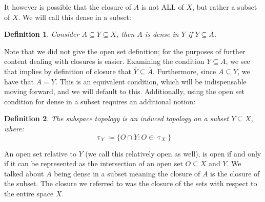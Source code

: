 \documentclass[10pt,letterpaper]{article} %
\newtheorem{defn}{Definition}[section]
\begin{document}
It however is possible that the closure of $A$ is not ALL of $X$, but rather a subset of $X$. We will call this dense in a subset:
\begin{defn}
Consider $A \subseteq Y \subseteq X$, then $A$ is dense in $Y$ if $Y \subseteq \bar{A}$.
\end{defn}
Note that we did not give the open set definition; for the purposes of further content dealing with closures is easier. Examining the condition $Y \subseteq \bar{A}$, we see that implies by definition of closure that $\bar{Y} \subseteq \bar{A}$. Furthermore, since $A \subseteq Y$, we have that $\bar{A} = \bar{Y}$. This is an equivalent condition, which will be indispensable moving forward, and we will default to this. Additionally, using the open set condition for dense in a subset requires an additional notion:
\begin{defn}
The subspace topology is an induced topology on a subset $Y \subseteq X$, where:
\begin{equation*}
  \uptau_Y \coloneq \{O \cap Y : O \in \uptau_X\}
\end{equation*}
\end{defn}
An open set relative to $Y$ (we call this relatively open as well), is open if and only if it can be represented as the intersection of an open set $O \subseteq X$ and $Y$. We talked about $A$ being dense in a subset meaning the closure of $A$ is the closure of the subset. The closure we referred to was the closure of the sets with respect to the entire space $X$.\\
\end{document}
